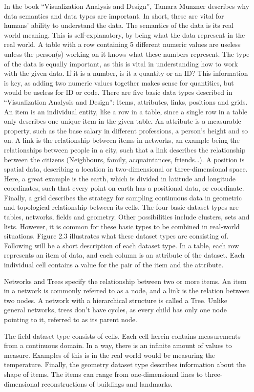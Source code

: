 \documentclass[Report.tex]{subfiles}
\begin{document}
In the book “Visualization Analysis and Design”, Tamara Munzner describes why data semantics and data types are important. In short, these are vital for humans’ ability to understand the data. The semantics of the data is its real world meaning. This is self-explanatory, by being what the data represent in the real world. A table with a row containing 5 different numeric values are useless unless the person(s) working on it knows what these numbers represent. The type of the data is equally important, as this is vital in understanding how to work with the given data. If it is a number, is it a quantity or an ID? This information is key, as adding two numeric values together makes sense for quantities, but would be useless for ID or code.
There are five basic data types described in “Visualization Analysis and Design”: Items, attributes, links, positions and grids. An item is an individual entity, like a row in a table, since a single row in a table only describes one unique item in the given table. An attribute is a measurable property, such as the base salary in different professions, a person’s height and so on. A link is the relationship between items in networks, an example being the relationships between people in a city, such that a link describes the relationship between the citizens (Neighbours, family, acquaintances, friends…). A position is spatial data, describing a location in two-dimensional or three-dimensional space. Here, a great example is the earth, which is divided in latitude and longitude coordinates, such that every point on earth has a positional data, or coordinate. Finally, a grid describes the strategy for sampling continuous data in geometric and topological relationship between its cells. 
The four basic dataset types are tables, networks, fields and geometry. Other possibilities include clusters, sets and lists. However, it is common for these basic types to be combined in real-world situations. Figure 2.3 illustrates what these dataset types are consisting of. Following will be a short description of each dataset type. 
In a table, each row represents an item of data, and each column is an attribute of the dataset. Each individual cell contains a value for the pair of the item and the attribute.

Networks and Trees specify the relationship between two or more items. An item in a network is commonly referred to as a node, and a link is the relation between two nodes. 
A network with a hierarchical structure is called a Tree. Unlike general networks, trees don’t have cycles, as every child has only one node pointing to it, referred to as its parent node.

The field dataset type consists of cells. Each cell herein contains measurements from a continuous domain. In a way, there is an infinite amount of values to measure. Examples of this is in the real world would be measuring the temperature. 
Finally, the geometry dataset type describes information about the shape of items. The items can range from one-dimensional lines to three-dimensional reconstructions of buildings and landmarks.  
\end{document}
